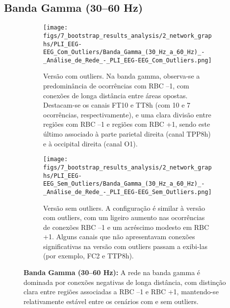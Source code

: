 \subsection{Banda Gamma (30–60 Hz)}
\begin{figure}[H]
    \centering
    \begin{subfigure}[b]{0.48\textwidth}
        \texttt{[image: figs/7\_bootstrap\_results\_analysis/2\_network\_graphs/PLI\_EEG-EEG\_Com\_Outliers/Banda\_Gamma\_(30\_Hz\_a\_60\_Hz)\_-\_Análise\_de\_Rede\_-\_PLI\_EEG-EEG\_Com\_Outliers.png]}
        \caption{\small Versão com outliers. Na banda gamma, observa-se a predominância de ocorrências com RBC –1, com conexões de longa distância entre áreas opostas. Destacam-se os canais FT10 e TT8h (com 10 e 7 ocorrências, respectivamente), e uma clara divisão entre regiões com RBC –1 e regiões com RBC +1, sendo este último associado à parte parietal direita (canal TPP8h) e à occipital direita (canal O1).}
    \end{subfigure}
    \hfill
    \begin{subfigure}[b]{0.48\textwidth}
        \texttt{[image: figs/7\_bootstrap\_results\_analysis/2\_network\_graphs/PLI\_EEG-EEG\_Sem\_Outliers/Banda\_Gamma\_(30\_Hz\_a\_60\_Hz)\_-\_Análise\_de\_Rede\_-\_PLI\_EEG-EEG\_Sem\_Outliers.png]}
        \caption{\small Versão sem outliers. A configuração é similar à versão com outliers, com um ligeiro aumento nas ocorrências de conexões RBC –1 e um acréscimo modesto em RBC +1. Alguns canais que não apresentavam conexões significativas na versão com outliers passam a exibi-las (por exemplo, FC2 e TTP8h).}
    \end{subfigure}
    \caption[Análise de Rede – Banda Gamma (PLI EEG–EEG)]{\small \textbf{Banda Gamma (30–60 Hz):} A rede na banda gamma é dominada por conexões negativas de longa distância, com distinção clara entre regiões associadas a RBC –1 e RBC +1, mantendo-se relativamente estável entre os cenários com e sem outliers.}
    \label{fig:rede_gamma_pli}
\end{figure}

